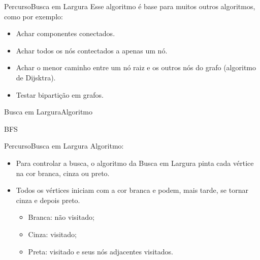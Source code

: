\documentclass[aspectratio=169]{beamer}
\begin{document}

\begin{frame}{Percurso}{Busca em Largura}
 Esse algoritmo é base para muitos outros algoritmos, como por exemplo:
\begin{itemize}
\item Achar componentes conectados.
\item Achar todos os nós contectados a apenas um nó.
\item Achar o menor caminho entre um nó raiz e os outros nós do grafo (algoritmo de Dijsktra).
\item Testar bipartição em grafos.

\end{itemize}
\end{frame}


\begin{frame}{Busca em Largura}{Algoritmo}
\begin{algorithm}[H]
\caption{BFS} 
\label{BuscaEmLarguraIdeia}
\end{algorithm}
\end{frame}


\begin{frame}{Percurso}{Busca em Largura}
Algoritmo:
\begin{itemize}
\item Para controlar a busca, o algoritmo da Busca em Largura pinta cada vértice na cor branca, cinza ou preto.
\item Todos os vértices iniciam com a cor branca e podem, mais tarde, se tornar cinza e depois preto.
\begin{itemize}
\item Branca: não visitado;
\item Cinza: visitado;
\item Preta: visitado e seus nós adjacentes visitados.
\end{itemize}
\end{itemize}
\end{frame}
\end{document}
